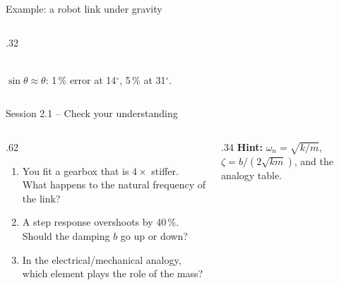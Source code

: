 \documentclass[aspectratio=169,10pt]{beamer}
\begin{document}
\begin{frame}{Example: a robot link under gravity}
\begin{columns}[T]
\begin{column}{.32\textwidth}
\\
\small $\sin\theta\approx\theta$: 1\,\% error at 14$^\circ$, 5\,\% at 31$^\circ$.
\end{column}
\end{columns}
\end{frame}

\begin{frame}{Session 2.1 -- Check your understanding}
\begin{columns}[T]
\begin{column}{.62\textwidth}
\begin{keybox}
\begin{enumerate}\setlength\itemsep{6pt}
\item You fit a gearbox that is $4\times$ stiffer. What happens to the natural frequency of the link?
\item A step response overshoots by 40\,\%. Should the damping $b$ go up or down?
\item In the electrical/mechanical analogy, which element plays the role of the mass?
\end{enumerate}
\end{keybox}
\end{column}
\begin{column}{.34\textwidth}
\small
\textbf{Hint:} $\omega_n=\sqrt{k/m}$, $\zeta=b/(2\sqrt{km})$, and the analogy table.
\end{column}
\end{columns}
\end{frame}
\end{document}
